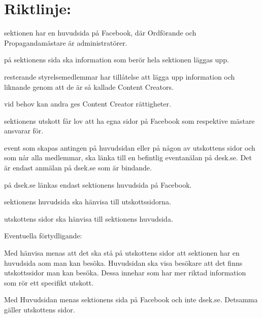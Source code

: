 \documentclass{dsekprotokoll}
\begin{document}
\section{Riktlinje:}
\begin{attlista}
\item sektionen har en huvudsida på Facebook, där Ordförande och
  Propagandamästare är
  administratörer.
\item på sektionens sida ska information som berör hela sektionen läggas upp.
\item resterande styrelsemedlemmar har tillåtelse att lägga upp
  information och liknande genom att de är så kallade Content Creators.
\item vid behov kan andra ges Content Creator rättigheter.
\item  sektionens utskott får lov att ha egna sidor på Facebook som
  respektive mästare ansvarar
  för.
\item event som skapas antingen på huvudsidan eller på någon av
  utskottens sidor och som
  når alla medlemmar, ska länka till en befintlig eventanälan på
  desk.se. Det är endast anmälan på dsek.se som är bindande.
\item på dsek.se länkas endast sektionens huvudsida på Facebook.
\item sektionens huvudsida ska hänvisa till utskottssidorna.
\item utskottens sidor ska hänvisa till sektionens huvudsida.

\end{attlista}

Eventuella förtydligande:

Med hänvisa menas att det ska stå på utskottens sidor att sektionen
har en huvudsida aom man
kan besöka. Huvudsidan ska visa besökare att det finns utskottssidor
man kan besöka. Dessa
innehar som har mer riktad information som rör ett specifikt utskott.

Med Huvudsidan menas sektionens sida på Facebook och inte dsek.se.
Detsamma gäller utskottens sidor.

\end{document}
